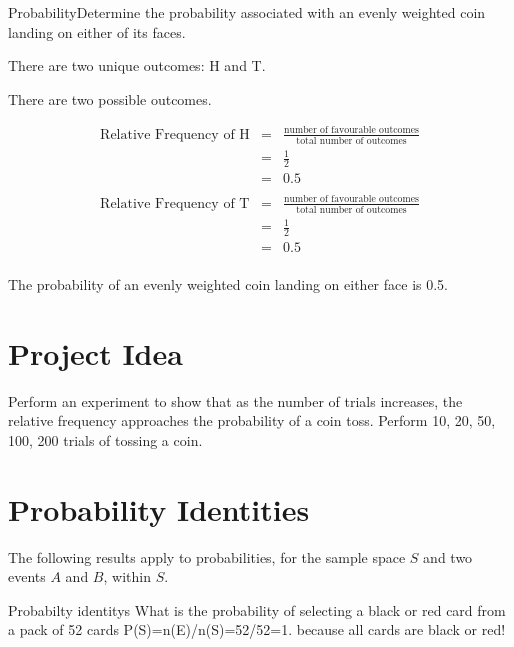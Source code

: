 \documentclass[10pt,a4paper,titlepage,twoside,openright]{report}
\begin{document}
\begin{wex}{Probability}{Determine the probability associated with an evenly weighted coin landing on either of its faces.}{
There are two unique outcomes: H and T.

There are two possible outcomes.

\begin{eqnarray*}
\mbox{Relative Frequency of H} &=& \frac{\mbox{number of favourable outcomes}}{\mbox{total number of outcomes}}\\
&=&\frac{1}{2}\\
&=&0.5\\
\\
\mbox{Relative Frequency of T} &=& \frac{\mbox{number of favourable outcomes}}{\mbox{total number of outcomes}}\\
&=&\frac{1}{2}\\
&=&0.5\\
\end{eqnarray*}

The probability of an evenly weighted coin landing on either face is 0.5.}
\end{wex}

\section{Project Idea}
Perform an experiment to show that as the number of trials increases, the relative frequency approaches the probability of a coin toss. Perform 10, 20, 50, 100, 200 trials of tossing a coin.

\section{Probability Identities}
The following results apply to probabilities, for the sample space $S$ and two events $A$ and $B$, within $S$.




\begin{wex}
{Probabilty identitys}
{What is the probability of selecting a black or red card from a pack of 52 cards}
{
P(S)=n(E)/n(S)=52/52=1. because all cards are black or red!
}
\end{wex}
\end{document}
